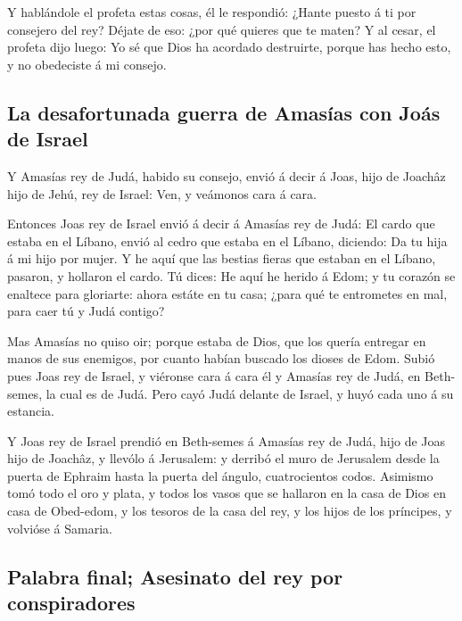  Y hablándole el profeta estas cosas, él le respondió:
¿Hante puesto á ti por consejero del rey? Déjate de eso: ¿por qué
quieres que te maten? Y al cesar, el profeta dijo luego: Yo sé que Dios
ha acordado destruirte, porque has hecho esto, y no obedeciste á mi
consejo.

\hypertarget{la-desafortunada-guerra-de-amasuxedas-con-jouxe1s-de-israel}{%
\subsection{La desafortunada guerra de Amasías con Joás de
Israel}\label{la-desafortunada-guerra-de-amasuxedas-con-jouxe1s-de-israel}}

 Y Amasías rey de Judá, habido su consejo, envió á decir á
Joas, hijo de Joachâz hijo de Jehú, rey de Israel: Ven, y veámonos cara
á cara.

 Entonces Joas rey de Israel envió á decir á Amasías rey de
Judá: El cardo que estaba en el Líbano, envió al cedro que estaba en el
Líbano, diciendo: Da tu hija á mi hijo por mujer. Y he aquí que las
bestias fieras que estaban en el Líbano, pasaron, y hollaron el cardo.
 Tú dices: He aquí he herido á Edom; y tu corazón se
enaltece para gloriarte: ahora estáte en tu casa; ¿para qué te
entrometes en mal, para caer tú y Judá contigo?

 Mas Amasías no quiso oir; porque estaba de Dios, que los
quería entregar en manos de sus enemigos, por cuanto habían buscado los
dioses de Edom.  Subió pues Joas rey de Israel, y viéronse
cara á cara él y Amasías rey de Judá, en Beth-semes, la cual es de Judá.
 Pero cayó Judá delante de Israel, y huyó cada uno á su
estancia.

 Y Joas rey de Israel prendió en Beth-semes á Amasías rey
de Judá, hijo de Joas hijo de Joachâz, y llevólo á Jerusalem: y derribó
el muro de Jerusalem desde la puerta de Ephraim hasta la puerta del
ángulo, cuatrocientos codos.  Asimismo tomó todo el oro y
plata, y todos los vasos que se hallaron en la casa de Dios en casa de
Obed-edom, y los tesoros de la casa del rey, y los hijos de los
príncipes, y volvióse á Samaria.

\hypertarget{palabra-final-asesinato-del-rey-por-conspiradores}{%
\subsection{Palabra final; Asesinato del rey por
conspiradores}\label{palabra-final-asesinato-del-rey-por-conspiradores}}

